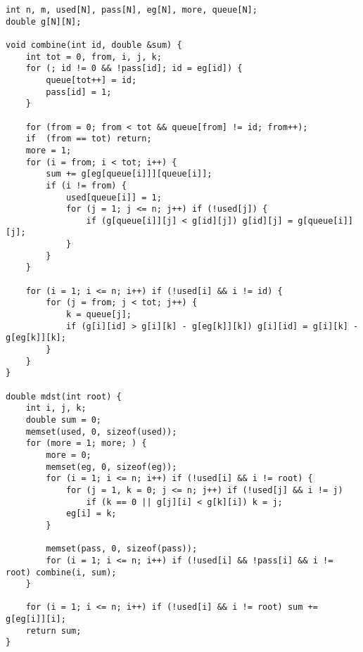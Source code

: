 \begin{lstlisting}
int n, m, used[N], pass[N], eg[N], more, queue[N];
double g[N][N];

void combine(int id, double &sum) {
	int tot = 0, from, i, j, k;
	for (; id != 0 && !pass[id]; id = eg[id]) {
		queue[tot++] = id;
		pass[id] = 1;
	}

	for (from = 0; from < tot && queue[from] != id; from++);
	if  (from == tot) return;
	more = 1;
	for (i = from; i < tot; i++) {
		sum += g[eg[queue[i]]][queue[i]];
		if (i != from) {
			used[queue[i]] = 1;
			for (j = 1; j <= n; j++) if (!used[j]) {
				if (g[queue[i]][j] < g[id][j]) g[id][j] = g[queue[i]][j];
			}
		}
	}

	for (i = 1; i <= n; i++) if (!used[i] && i != id) {
		for (j = from; j < tot; j++) {
			k = queue[j];
			if (g[i][id] > g[i][k] - g[eg[k]][k]) g[i][id] = g[i][k] - g[eg[k]][k];
		}
	}
}

double mdst(int root) {
	int i, j, k;
	double sum = 0;
	memset(used, 0, sizeof(used));
	for (more = 1; more; ) {
		more = 0;
		memset(eg, 0, sizeof(eg));
		for (i = 1; i <= n; i++) if (!used[i] && i != root) {
			for (j = 1, k = 0; j <= n; j++) if (!used[j] && i != j)
				if (k == 0 || g[j][i] < g[k][i]) k = j;
			eg[i] = k;
		}

		memset(pass, 0, sizeof(pass));
		for (i = 1; i <= n; i++) if (!used[i] && !pass[i] && i != root) combine(i, sum);
	}

	for (i = 1; i <= n; i++) if (!used[i] && i != root) sum += g[eg[i]][i];
	return sum;
}
\end{lstlisting}
